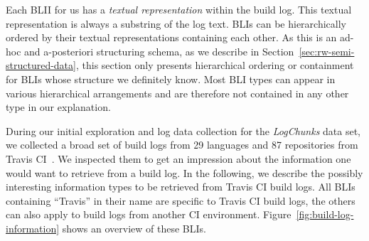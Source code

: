 \documentclass[\myrootdir/main.tex]{subfiles}
\begin{document}
Each BLII for us has a \emph{textual representation} within the build log.
This textual representation is always a substring of the log text.
BLIs can be hierarchically ordered by their textual representations containing each other.
As this is an ad-hoc and a-posteriori structuring schema, as we describe in Section~\ref{sec:rw-semi-structured-data}, this section only presents hierarchical ordering or containment for BLIs whose structure we definitely know.
Most BLI types can appear in various hierarchical arrangements and are therefore not contained in any other type in our explanation.

During our initial exploration and log data collection for the \emph{LogChunks} data set, we collected a broad set of build logs from 29 languages and 87 repositories from Travis CI~\cite{travisci2019webpage}.
We inspected them to get an impression about the information one would want to retrieve from a build log.
In the following, we describe the possibly interesting information types to be retrieved from Travis CI build logs.
All BLIs containing ``Travis'' in their name are specific to Travis CI build logs, the others can also apply to build logs from another CI environment.
Figure~\ref{fig:build-log-information} shows an overview of these BLIs.
\end{document}
